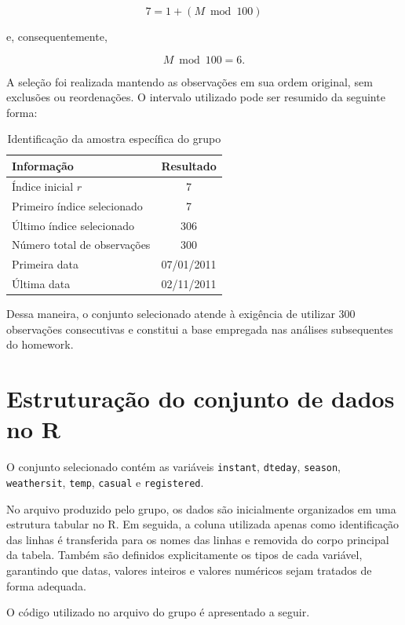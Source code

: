 \documentclass[12pt,a4paper]{article}
\begin{document}
\begin{equation}
7 = 1 + (M \bmod 100)
\end{equation}

e, consequentemente,

\begin{equation}
M \bmod 100 = 6.
\end{equation}

A seleção foi realizada mantendo as observações em sua ordem original, sem
exclusões ou reordenações. O intervalo utilizado pode ser resumido da seguinte
forma:

\begin{table}[H]
\centering
\caption{Identificação da amostra específica do grupo}
\begin{tabular}{lc}
\toprule
\textbf{Informação} & \textbf{Resultado} \\
\midrule
Índice inicial $r$ & 7 \\
Primeiro índice selecionado & 7 \\
Último índice selecionado & 306 \\
Número total de observações & 300 \\
Primeira data & 07/01/2011 \\
Última data & 02/11/2011 \\
\bottomrule
\end{tabular}
\end{table}

Dessa maneira, o conjunto selecionado atende à exigência de utilizar 300
observações consecutivas e constitui a base empregada nas análises subsequentes
do homework.

\section{Estruturação do conjunto de dados no R}

O conjunto selecionado contém as variáveis \texttt{instant}, \texttt{dteday},
\texttt{season}, \texttt{weathersit}, \texttt{temp}, \texttt{casual} e
\texttt{registered}.

No arquivo produzido pelo grupo, os dados são inicialmente organizados em uma
estrutura tabular no R. Em seguida, a coluna utilizada apenas como identificação
das linhas é transferida para os nomes das linhas e removida do corpo principal
da tabela. Também são definidos explicitamente os tipos de cada variável,
garantindo que datas, valores inteiros e valores numéricos sejam tratados de
forma adequada.

O código utilizado no arquivo do grupo é apresentado a seguir.
\end{document}
